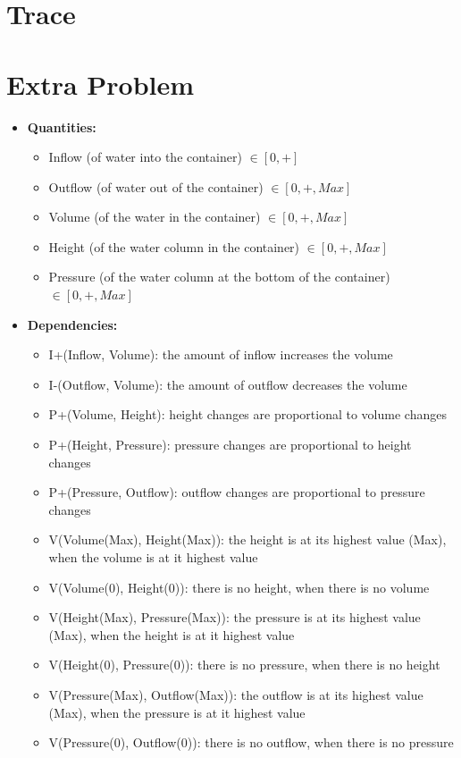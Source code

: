 \documentclass[a4paper]{article}
\begin{document}
\section{Trace}


\section{Extra Problem}

\begin{itemize}
\item \textbf{Quantities:}
\begin{itemize}
\item Inflow (of water into the container) $\in [0, +]$
\item Outflow (of water out of the container) $\in [0, +, Max]$
\item Volume (of the water in the container) $\in [0, +, Max]$
\item Height (of the water column in the container) $\in [0, +, Max]$
\item Pressure (of the water column at the bottom of the container) $\in [0, +, Max]$
\end{itemize}

\item \textbf{Dependencies:}
\begin{itemize}
\item I+(Inflow, Volume): the amount of inflow increases the volume
\item I-(Outflow, Volume): the amount of outflow decreases the volume
\item P+(Volume, Height): height changes are proportional to volume changes
\item P+(Height, Pressure): pressure changes are proportional to height changes
\item P+(Pressure, Outflow): outflow changes are proportional to pressure changes
\item V(Volume(Max), Height(Max)): the height is at its highest value (Max), when the volume is at it highest value
\item V(Volume(0), Height(0)): there is no height, when there is no volume
\item V(Height(Max), Pressure(Max)): the pressure is at its highest value (Max), when the height is at it highest value
\item V(Height(0), Pressure(0)): there is no pressure, when there is no height
\item V(Pressure(Max), Outflow(Max)): the outflow is at its highest value (Max), when the pressure is at it highest value
\item V(Pressure(0), Outflow(0)): there is no outflow, when there is no pressure
\end{itemize}
\end{itemize}
\end{document}

